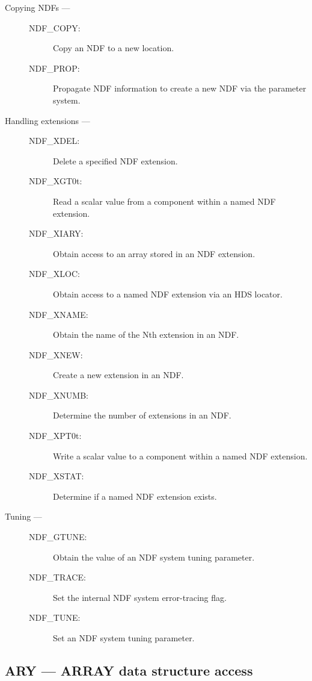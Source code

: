 \begin{description}
\item [Copying NDFs ---]

\begin{description}
\item [NDF\_COPY:]  Copy an NDF to a new location.
\item [NDF\_PROP:]  Propagate NDF information to create a new NDF via the parameter system.
\end{description}

\item [Handling extensions ---]

\begin{description}
\item [NDF\_XDEL:]  Delete a specified NDF extension.
\item [NDF\_XGT0t:]  Read a scalar value from a component within a named NDF extension.
\item [NDF\_XIARY:]  Obtain access to an array stored in an NDF extension.
\item [NDF\_XLOC:]  Obtain access to a named NDF extension via an HDS locator.
\item [NDF\_XNAME:]  Obtain the name of the Nth extension in an NDF.
\item [NDF\_XNEW:]  Create a new extension in an NDF.
\item [NDF\_XNUMB:]  Determine the number of extensions in an NDF.
\item [NDF\_XPT0t:]  Write a scalar value to a component within a named NDF extension.
\item [NDF\_XSTAT:]  Determine if a named NDF extension exists.
\end{description}

\item [Tuning ---]

\begin{description}
\item [NDF\_GTUNE:]  Obtain the value of an NDF system tuning parameter.
\item [NDF\_TRACE:]  Set the internal NDF system error-tracing flag.
\item [NDF\_TUNE:]  Set an NDF system tuning parameter.
\end{description}

\end{description}

\newpage

\subsection{ARY --- ARRAY data structure access}

